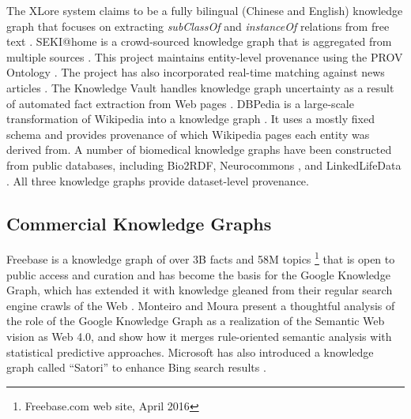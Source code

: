 The XLore system claims to be a fully bilingual (Chinese and English) knowledge graph that focuses on extracting \emph{subClassOf} and \emph{instanceOf} relations from free text \cite{wang2013xlore}.
SEKI@home is a crowd-sourced knowledge graph that is aggregated from multiple sources \cite{steiner2012seki}.
This project maintains entity-level provenance using the PROV Ontology \cite{Moreau_2015}.
The project has also incorporated real-time matching against news articles \cite{steiner_iswc_2012}.
The Knowledge Vault handles knowledge graph uncertainty as a result of automated fact extraction from Web pages \cite{Dong_2014}.
DBPedia is a large-scale transformation of Wikipedia into a knowledge graph \cite{Bizer_2009}.
It uses a mostly fixed schema and provides provenance of which Wikipedia pages each entity was derived from.
A number of biomedical knowledge graphs have been constructed from public databases, including Bio2RDF\cite{Callahan_2013}, Neurocommons \cite{Ruttenberg_2009}, and LinkedLifeData \cite{momtchev2009expanding}.
All three knowledge graphs provide dataset-level provenance.

\subsection{Commercial Knowledge Graphs}
Freebase is a knowledge graph of over 3B facts and 58M topics \footnote{Freebase.com web site, April 2016} that is open to public access and curation \cite{Bollacker_2008} and has become the basis for the Google Knowledge Graph, which has extended it with knowledge gleaned from their regular search engine crawls of the Web \cite{singhal2012introducing}.
Monteiro and Moura \cite{10110943220141101} present a thoughtful analysis of the role of the Google Knowledge Graph as a realization of the Semantic Web vision \cite{bernerslee2000semantic} as Web 4.0, and show how it merges rule-oriented semantic analysis with statistical predictive approaches.
Microsoft has also introduced a knowledge graph called ``Satori'' to enhance Bing search results \cite{qian2013understand}.
